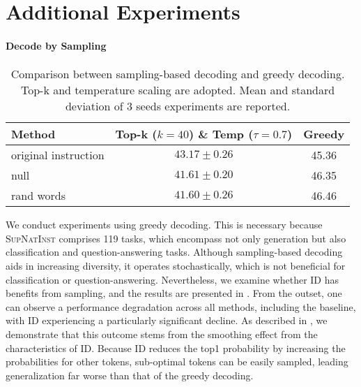 \label{appendix_experimental_setup}

\section{Additional Experiments}
\label{sec:additional}
\paragraph{Decode by Sampling}
\begin{table}[h]
\centering
\caption{Comparison between sampling-based decoding and greedy decoding. Top-k and temperature scaling are adopted. Mean and standard deviation of 3 seeds experiments are reported.}
\label{tab:sampling}
\begin{tabular}{l|c|c}
\toprule
Method & Top-k ($k=40$) \& Temp ($\tau=0.7$) & Greedy\\
\midrule \midrule
original instruction & \(43.17 \pm 0.26\) & 45.36\\
null & \(41.61 \pm 0.20\) & 46.35\\
rand words & \(41.60 \pm 0.26\) & 46.46\\
\bottomrule
\end{tabular}
\end{table}

We conduct experiments using greedy decoding. This is necessary because \textsc{SupNatInst} comprises 119 tasks, which encompass not only generation but also classification and question-answering tasks. Although sampling-based decoding aids in increasing diversity, it operates stochastically, which is not beneficial for classification or question-answering. Nevertheless, we examine whether ID has benefits from sampling, and the results are presented in . From the outset, one can observe a performance degradation across all methods, including the baseline, with ID experiencing a particularly significant decline. As described in , we demonstrate that this outcome stems from the smoothing effect from the characteristics of ID. Because ID reduces the top1 probability by increasing the probabilities for other tokens, sub-optimal tokens can be easily sampled, leading generalization far worse than that of the greedy decoding.


